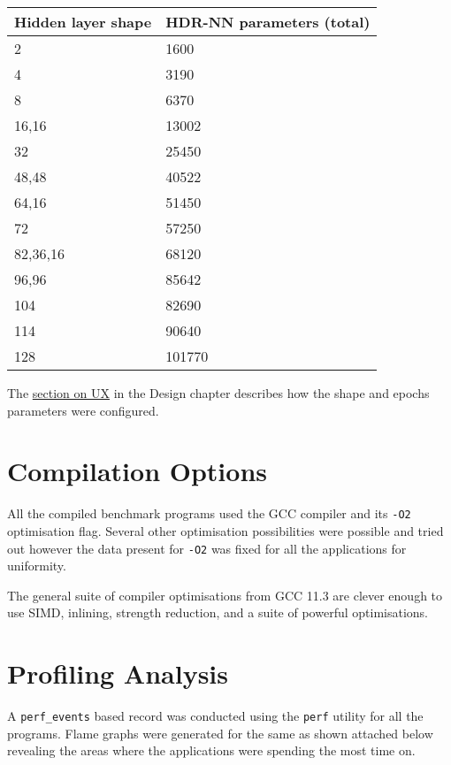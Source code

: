 \begin{table}[h]
	\centering
	\begin{tabular}{ |p{11em}|p{14em}| }
		\hline
			\textbf{Hidden layer shape} & \textbf{HDR-NN parameters} (total)\\
		\hline
			2 & 1600 \\
		\hline
			4 & 3190 \\
		\hline
			8 & 6370 \\
		\hline
			16,16 & 13002 \\
		\hline
			32 & 25450 \\
		\hline
			48,48 & 40522 \\
		\hline
			64,16 & 51450 \\
		\hline
			72 & 57250 \\
		\hline
			82,36,16 & 68120 \\
		\hline
			96,96 & 85642 \\
		\hline
			104 & 82690 \\
		\hline
			114 & 90640 \\
		\hline
			128 & 101770 \\
		\hline
	\end{tabular}
\end{table}

The \hyperref[section:hdrnn-ux]{section on UX} in the Design chapter describes how the shape and epochs parameters were configured.

\section{Compilation Options}

All the compiled benchmark programs used the GCC compiler and its \texttt{-O2} optimisation flag. Several other optimisation possibilities were possible and tried out however the data present for \texttt{-O2} was fixed for all the applications for uniformity.

The general suite of compiler optimisations from GCC 11.3 are clever enough to use SIMD, inlining, strength reduction, and a suite of powerful optimisations.

\section{Profiling Analysis}

A \texttt{perf\_events} based record was conducted using the \texttt{perf} utility for all the programs. Flame graphs were generated for the same as shown attached below revealing the areas where the applications were spending the most time on.

